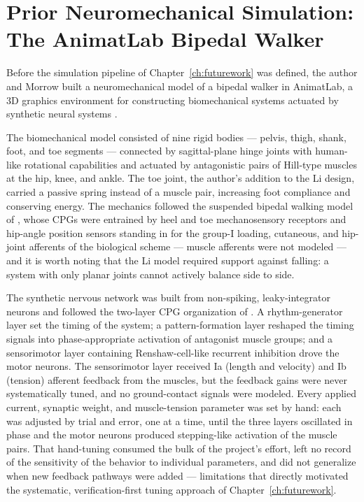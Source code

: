 \section{Prior Neuromechanical Simulation: The AnimatLab Bipedal Walker}\label{sec:prior_walker}

Before the simulation pipeline of Chapter~\ref{ch:futurework} was defined, the author and Morrow built a neuromechanical model of a bipedal walker in AnimatLab, a 3D graphics environment for constructing biomechanical systems actuated by synthetic neural systems \citep{cofer_animatlab_2010}. 

The biomechanical model consisted of nine rigid bodies --- pelvis, thigh, shank, foot, and toe segments --- connected by sagittal-plane hinge joints with human-like rotational capabilities and actuated by antagonistic pairs of Hill-type muscles at the hip, knee, and ankle. The toe joint, the author's addition to the Li design, carried a passive spring instead of a muscle pair, increasing foot compliance and conserving energy. The mechanics followed the suspended bipedal walking model of \citet{li_bipedal_2017}, whose CPGs were entrained by heel and toe mechanosensory receptors and hip-angle position sensors standing in for the group-I loading, cutaneous, and hip-joint afferents of the biological scheme --- muscle afferents were not modeled --- and it is worth noting that the Li model required support against falling: a system with only planar joints cannot actively balance side to side.

The synthetic nervous network was built from non-spiking, leaky-integrator neurons and followed the two-layer CPG organization of \citet{deng_neuromechanical_2019}. A rhythm-generator layer set the timing of the system; a pattern-formation layer reshaped the timing signals into phase-appropriate activation of antagonist muscle groups; and a sensorimotor layer containing Renshaw-cell-like recurrent inhibition drove the motor neurons. The sensorimotor layer received Ia (length and velocity) and Ib (tension) afferent feedback from the muscles, but the feedback gains were never systematically tuned, and no ground-contact signals were modeled. Every applied current, synaptic weight, and muscle-tension parameter was set by hand: each was adjusted by trial and error, one at a time, until the three layers oscillated in phase and the motor neurons produced stepping-like activation of the muscle pairs. That hand-tuning consumed the bulk of the project's effort, left no record of the sensitivity of the behavior to individual parameters, and did not generalize when new feedback pathways were added --- limitations that directly motivated the systematic, verification-first tuning approach of Chapter~\ref{ch:futurework}.

